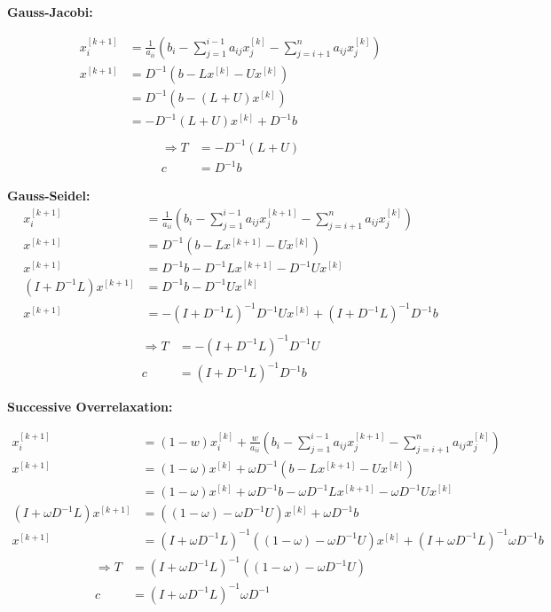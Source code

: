 {\color{blue}

\textbf{Gauss-Jacobi:}

\begin{align*}
x_i^{[k+1]} &= \frac{1}{a_{ii}} \left( b_i - \sum_{j=1}^{i-1} a_{ij} x_j^{[k]} - \sum_{j=i+1}^n a_{ij} x_j^{[k]} \right) \\
x^{[k+1] }&= D^{-1} \left( b - L x^{[k]} - U x^{[k]} \right) \\
&= D^{-1} \left( b - \left(L + U\right) x^{[k]} \right) \\
&= -D^{-1} \left( L + U \right) x^{[k]} + D^{-1} b \\
\end{align*}
\begin{align*}
\Rightarrow
T &= -D^{-1} \left( L + U \right) \\
c &= D^{-1} b
\end{align*}

\textbf{Gauss-Seidel:}
\begin{align*}
x_i^{[k+1]} &= \frac{1}{a_{ii}} \left(b_i - \sum_{j=1}^{i-1} a_{ij}
x_j^{[k+1]} - \sum_{j=i+1}^n a_{ij} x_j^{[k]} \right) \\
x^{[k+1] }&= D^{-1} \left( b - L x^{[k+1]} - U x^{[k]} \right) \\
x^{[k+1] }&= D^{-1} b - D^{-1} L x^{[k+1]} - D^{-1} U x^{[k]}  \\
(I + D^{-1} L) x^{[k+1]} &= D^{-1} b - D^{-1} U x^{[k]} \\
x^{[k+1]} &= - (I + D^{-1} L)^{-1} D^{-1} U x^{[k]} + (I + D^{-1} L)^{-1} D^{-1} b  \\
\end{align*}
\begin{align*}
\Rightarrow
T &= - (I + D^{-1} L)^{-1} D^{-1} U \\
c &= (I + D^{-1} L)^{-1} D^{-1} b
\end{align*}

\textbf{Successive Overrelaxation:}

\begin{align*}
x_i^{[k+1]} &= (1 - w)x_i^{[k]} + \frac{w}{a_{ii}} \left(b_i
- \sum_{j=1}^{i-1} a_{ij} x_j^{[k+1]} - \sum_{j=i+1}^n a_{ij}
x_j^{[k]} \right) \\
x^{[k+1]} &= \left(1-\omega\right) x^{[k]} + \omega D^{-1} \left( b -
L x^{[k+1]} - U x^{[k]}\right) \\
&= \left( 1 - \omega \right) x^{[k]} + \omega D^{-1} b - \omega
D^{-1} L x^{[k+1]} - \omega D^{-1} U x^{[k]} \\
\left( I + \omega D^{-1} L \right) x^{[k+1]} &= \left( \left( 1
- \omega \right)  - \omega D^{-1} U \right)  x^{[k]} + \omega D^{-1} b \\
x^{[k+1]} &= \left( I + \omega D^{-1} L \right)^{-1} \left( \left( 1
- \omega \right) - \omega D^{-1} U \right) x^{[k]} + \left( I
+ \omega D^{-1} L \right)^{-1} \omega D^{-1} b
\end{align*}
\begin{align*}
\Rightarrow
T &= \left( I + \omega D^{-1} L \right)^{-1} \left( \left( 1
- \omega \right) - \omega D^{-1} U \right) \\
c &= \left( I + \omega D^{-1} L \right)^{-1} \omega D^{-1}
\end{align*}

}
